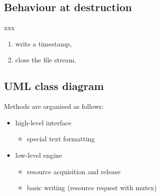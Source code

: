 	
	\subsection{Behaviour at destruction}
	
		xxx
	
		\begin{enumerate}
			\item write a timestamp,
			\item close the file stream.
		\end{enumerate}
	
	
	\subsection{UML class diagram}
	
		Methods are organised as follows:
		\begin{itemize}
			\item high-level interface
				\begin{itemize}
					\item special text formatting
				\end{itemize}
			\item low-level engine
				\begin{itemize}
					\item resource acquisition and release
					\item basic writing (resource request with mutex)
				\end{itemize}
		\end{itemize}
		
